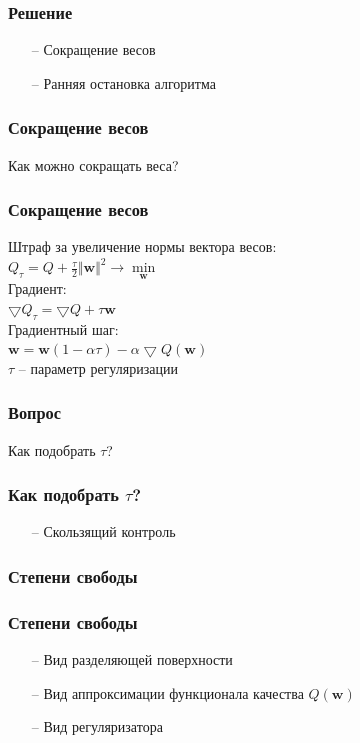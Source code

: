 \documentclass[12pt]{beamer}
\begin{document}
\begin{frame}\frametitle{Решение}
\begin{itemize}
\item[--] Сокращение весов
\item[--] Ранняя остановка алгоритма
\end{itemize}
\end{frame}

\begin{frame}\frametitle{Сокращение весов}
Как можно сокращать веса?
\end{frame}

\begin{frame}\frametitle{Сокращение весов}
Штраф за увеличение нормы вектора весов:\\
$Q_{\tau} = Q + \frac{\tau}{2}\Vert \mathbf{w} \Vert^2 \rightarrow \min\limits_{\mathbf{w}}$\\
\vspace{5mm}
Градиент:\\
$\bigtriangledown Q_{\tau} = \bigtriangledown Q + \tau \mathbf{w}$\\
\vspace{5mm}
Градиентный шаг:\\
$\mathbf{w} = \mathbf{w}(1-\alpha \tau) - \alpha \bigtriangledown Q(\mathbf{w})$\\
$\tau$ -- параметр регуляризации
\end{frame}

\begin{frame}\frametitle{Вопрос}
Как подобрать $\tau$?
\end{frame}

\begin{frame}\frametitle{Как подобрать $\tau$?}
\begin{itemize}
\item[--] Скользящий контроль
\end{itemize}
\end{frame}

\begin{frame}\frametitle{Степени свободы}

\end{frame}

\begin{frame}\frametitle{Степени свободы}
\begin{itemize}
\item[--] Вид разделяющей поверхности
\item[--] Вид аппроксимации функционала качества $Q(\mathbf{w})$
\item[--] Вид регуляризатора
\end{itemize}
\end{frame}
\end{document}
